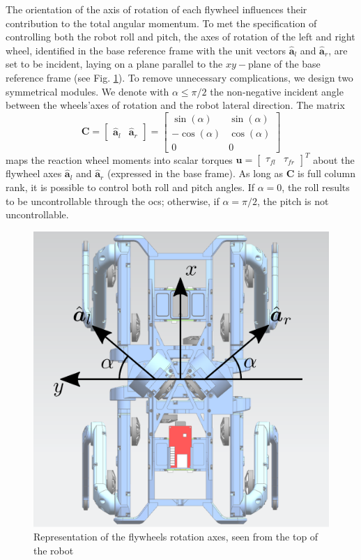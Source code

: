 \documentclass[letterpaper, 10 pt, conference]{ieeeconf}  %
\begin{document}
The orientation of the axis of rotation of each flywheel influences their contribution to the total angular momentum. To met the specification of controlling both the robot roll and pitch, the axes of rotation of the left and right wheel, identified in the base reference frame with the unit vectors $\hat{\bm{a}}_l$ and $\hat{\bm{a}}_r$, are set to be incident, laying on a plane parallel to the $xy-$plane of the base reference frame (see Fig. \ref{fig:angVel}). 
To remove unnecessary complications, we design two symmetrical modules. We denote with $\alpha \leq \pi/2$ the non-negative incident angle between the wheels'axes of rotation and the robot lateral direction. The matrix 
\begin{equation}
\bm{C} = 
\left[ \begin{array}{cc}
\hat{\bm{a}}_l & \hat{\bm{a}}_r
\end{array} \right] = 
\left[ \begin{array}{cc}
\sin(\alpha) & \sin(\alpha) \\
-\cos(\alpha) & \cos(\alpha) \\
0 & 0
\end{array} \right]
\end{equation}
maps the reaction wheel moments into scalar torques $\bm{u} = \left[\begin{array}{cc} \tau_{fl} & \tau_{fr} \end{array} \right]^T$ about the flywheel axes $\hat{\bm{a}}_l$ and $\hat{\bm{a}}_r$ (expressed in the base frame).
As long as $\bm{C}$ is full column rank, it is possible to control both roll and pitch angles. If $\alpha = 0$, the roll results to be uncontrollable through the \gls{ocs}; otherwise, if $\alpha = \pi/2$, the pitch is not uncontrollable. 
\begin{figure}
	\centering
	\includegraphics[width=0.7\linewidth]{figures/angular_velocities.eps}
	\caption{\small Representation of the flywheels rotation axes, seen from the top of the robot}
	\label{fig:angVel}
\end{figure}
\end{document}
